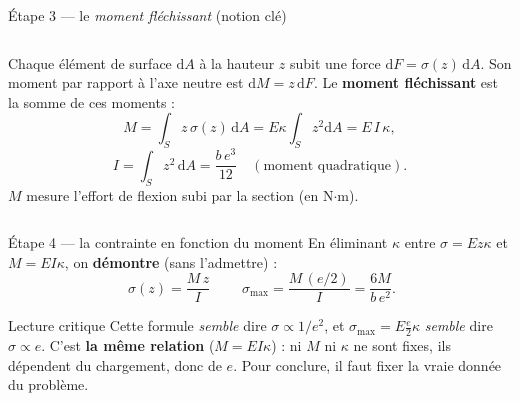\documentclass[11pt,aspectratio=169]{beamer}
\begin{document}
\begin{frame}{Étape 3 --- le \emph{moment fléchissant} (notion clé)}
  \begin{columns}[c]
    \centering
    \footnotesize
    Chaque élément de surface $\mathrm{d}A$ à la hauteur $z$ subit une force
    $\mathrm{d}F=\sigma(z)\,\mathrm{d}A$. Son moment par rapport à l'axe neutre
    est $\mathrm{d}M=z\,\mathrm{d}F$.
    Le \textbf{moment fléchissant} est la somme de ces moments :
    \[ M=\int_{S} z\,\sigma(z)\,\mathrm{d}A
        =E\kappa\!\int_{S} z^{2}\mathrm{d}A=E\,I\,\kappa, \]
    \[ I=\int_{S} z^{2}\,\mathrm{d}A=\frac{b\,e^{3}}{12}\quad(\text{moment quadratique}). \]
    \centering\textcolor{verre}{$M$ mesure l'effort de flexion subi par la section
    (en N$\cdot$m).}
  \end{columns}
\end{frame}

\begin{frame}{Étape 4 --- la contrainte en fonction du moment}
  \footnotesize
  En éliminant $\kappa$ entre $\sigma=Ez\kappa$ et $M=EI\kappa$, on \textbf{démontre}
  (sans l'admettre) :
  \[ \boxed{\;\sigma(z)=\frac{M\,z}{I}\;}\qquad
     \sigma_{\max}=\frac{M\,(e/2)}{I}=\frac{6M}{b\,e^{2}} . \]
  \begin{block}{Lecture critique}
  Cette formule \emph{semble} dire $\sigma\propto 1/e^{2}$, et
  $\sigma_{\max}=E\tfrac{e}{2}\kappa$ \emph{semble} dire $\sigma\propto e$. C'est
  \textbf{la même relation} ($M=EI\kappa$) : ni $M$ ni $\kappa$ ne sont fixes, ils
  dépendent du chargement, donc de $e$. Pour conclure, il faut fixer la vraie
  donnée du problème.
  \end{block}
\end{frame}
\end{document}
